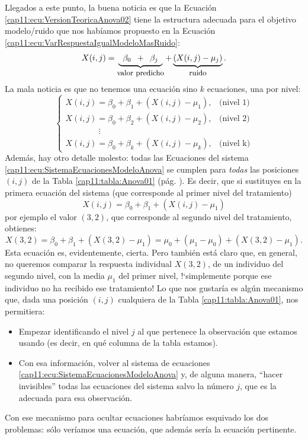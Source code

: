 Llegados a este punto, la buena noticia es que la Ecuación \ref{cap11:ecu:VersionTeoricaAnova02} tiene la estructura adecuada para el objetivo modelo/ruido que nos habíamos propuesto en la Ecuación \ref{cap11:ecu:VarRespuestaIgualModeloMasRuido}:
\[
X(i,j)=\underbrace{\phantom{a}\beta_0\phantom{a} + \phantom{a}\beta_j\phantom{a}}_{\mbox{\small valor predicho}}+\underbrace{(X(i,j)-\mu_j)}_{\mbox{\small ruido}}.
\]
La mala noticia es que no tenemos una ecuación sino  $k$ ecuaciones, una por nivel:
\begin{equation}
\label{cap11:ecu:SistemaEcuacionesModeloAnova}
\begin{cases}
X(i,j)=\beta_0+\beta_1+(X(i,j)-\mu_1),& \mbox{(nivel 1)}\\
X(i,j)=\beta_0+\beta_2+(X(i,j)-\mu_2),& \mbox{(nivel 2)}\\
\qquad\qquad\vdots\\
X(i,j)=\beta_0+\beta_k+(X(i,j)-\mu_k),& \mbox{(nivel k)}
\end{cases}
\end{equation}
Además, hay otro detalle molesto: todas las Ecuaciones del sistema \ref{cap11:ecu:SistemaEcuacionesModeloAnova} se cumplen para {\em todas} las posiciones $(i,j)$ de la Tabla \ref{cap11:tabla:Anova01} (pág. \pageref{cap11:tabla:Anova01}).  Es decir, que si sustituyes en la primera ecuación del sistema (que corresponde al primer nivel del tratamiento)
\[
X(i,j)=\beta_0+\beta_1+(X(i,j)-\mu_1)
\]
por ejemplo el valor $(3,2)$, que corresponde al segundo nivel del tratamiento, obtienes:
\[
X(3,2)=\beta_0+\beta_1+(X(3,2)-\mu_1)=\mu_0+(\mu_1-\mu_0)+(X(3,2)-\mu_1).
\]
Esta ecuación es, evidentemente, cierta. Pero también está claro que, en general, no queremos comparar la respuesta individual $X(3,2)$, de un individuo del segundo nivel,  con la media $\mu_1$ del primer nivel, {!`}simplemente porque ese individuo no ha recibido ese tratamiento! Lo que nos gustaría es algún mecanismo que, dada una posición $(i,j)$ cualquiera de la Tabla \ref{cap11:tabla:Anova01}, nos permitiera:
\begin{itemize}
  \item Empezar identificando el nivel $j$ al que pertenece la observación que estamos usando (es decir, en qué columna de la tabla estamos).
  \item Con esa información, volver al sistema de ecuaciones \ref{cap11:ecu:SistemaEcuacionesModeloAnova} y, de alguna manera, ``hacer invisibles'' todas las ecuaciones del sistema salvo la número $j$, que es la adecuada para esa observación.
\end{itemize}
Con ese mecanismo para ocultar ecuaciones habríamos esquivado los dos problemas: sólo veríamos una ecuación, que además sería la ecuación pertinente.

